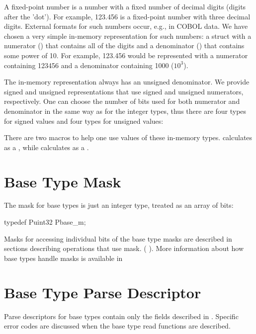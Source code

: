 A fixed-point number is a number with a fixed number of decimal digits
(digits after the 'dot').  For example, 123.456 is a fixed-point
number with three decimal digits.  External formats for such numbers
occur, e.g., in COBOL data.  We have chosen a very simple in-memory
representation for such numbers: a struct with a numerator ()
that contains all of the digits and a denominator () that
contains some power of 10.  For example, 123.456 would be represented
with a numerator containing 123456 and a denominator containing 1000 ($10^3$).

The in-memory representation always has an unsigned denominator. We
provide signed and unsigned representations that use signed and
unsigned numerators, respectively.  One can choose the number of bits
used for both numerator and denominator in the same way as for the
integer types, thus there are four types for signed values
and four types for unsigned values:


There are two macros to help one use values of these in-memory types.
 calculates  as a ,
while  calculates  as a .

\section{Base Type Mask}
\label{sec:base-type-mask}
The mask for base types is just an integer type, treated as an array
of bits:

\begin{centercode}
 typedef Puint32 Pbase\_m;
\end{centercode}
%
\noindent
Masks for accessing individual bits of the base type masks are described in
sections describing operations that use mask. (\cf{}
). 
More information about how base types handle masks is available in

\section{Base Type Parse Descriptor}
\label{sec:base-type-parse-descriptors}
Parse descriptors for base types contain only the fields described in 
.
Specific error codes are discussed when the base type read functions
are described.


